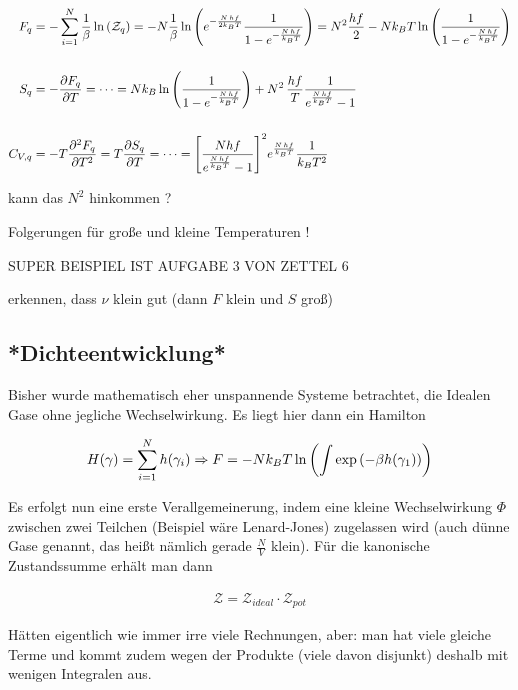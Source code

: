 \documentclass[../KlassMech_main.tex]{subfiles}
\begin{document}
\begin{itemize}
\begin{align*}
F_q &= -\sum\limits_{i=1}^N \frac{1}{\beta} \ln\qty(\mathcal{Z}_q) = -N \frac{1}{\beta} \ln\qty(e^{-\frac{N \, h f}{2 k_B T}} \frac{1}{1-e^{-\frac{N \, h f}{k_B T}}}) = N^2 \frac{h f}{2} - N k_B T \ln\qty(\frac{1}{1-e^{-\frac{N \, h f}{k_B T}}})
\\\\
S_q &= -\pdv{F_q}{T} = \dots = N k_B \ln\qty(\frac{1}{1-e^{-\frac{N \, h f}{k_B T}}}) + N^2 \, \frac{h f}{T} \frac{1}{e^{\frac{N \, h f}{k_B T}}-1} 
\\\\
C_{V, q} &= -T \pdv[2]{F_q}{T} = T \pdv{S_q}{T} = \dots = \qty[\frac{N h f}{e^{\frac{N \, h f}{k_B T}}-1}]^2 e^{\frac{N \, h f}{k_B T}} \frac{1}{k_B T^2}
\end{align*}

kann das $N^2$ hinkommen ?

\end{itemize}

Folgerungen für große und kleine Temperaturen !


SUPER BEISPIEL IST AUFGABE 3 VON ZETTEL 6

erkennen, dass $\nu$ klein gut (dann $F$ klein und $S$ groß)



	\subsection{*Dichteentwicklung*}
Bisher wurde mathematisch eher unspannende Systeme betrachtet, die Idealen Gase ohne jegliche Wechselwirkung. Es liegt hier dann ein Hamilton

\begin{equation}\label{key}
H\qty(\gamma) = \sum\limits^N_{i=1} h\qty(\gamma_i) \Rightarrow F = -N k_B T \ln\qty(\int \exp\qty(-\beta h(\gamma_1)))
\end{equation}

Es erfolgt nun eine erste Verallgemeinerung, indem eine kleine Wechselwirkung $\Phi$ zwischen zwei Teilchen (Beispiel wäre Lenard-Jones) zugelassen wird (auch dünne Gase genannt, das heißt nämlich gerade $\frac{N}{V}$ klein). Für die kanonische Zustandssumme erhält man dann

\begin{align}\label{key}
\mathcal{Z} = \mathcal{Z}_{ideal} \cdot \mathcal{Z}_{pot}
\end{align}

Hätten eigentlich wie immer irre viele Rechnungen, aber: man hat viele gleiche Terme und kommt zudem wegen der Produkte (viele davon disjunkt) deshalb mit wenigen Integralen aus.
\end{document}
